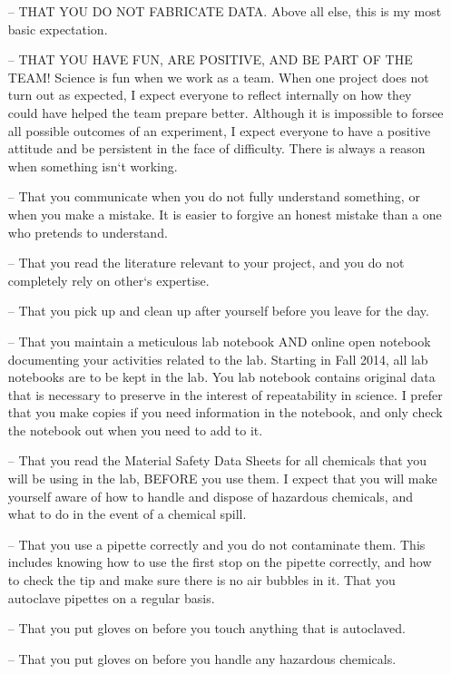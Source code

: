 \documentclass[11pt, oneside]{article}
\begin{document}
		\begin{itemize}


			\item[--] THAT YOU DO NOT FABRICATE DATA.  Above all else, this is my most basic expectation.
			\item[--] THAT YOU HAVE FUN, ARE POSITIVE, AND BE PART OF THE TEAM!  Science is fun when we work as a team.  When one project 			does not turn out as expected, I expect everyone to reflect internally on how they could have helped the team prepare better.  Although it is 			impossible to forsee all possible outcomes of an experiment, I expect everyone to have a positive attitude and be persistent in the face of 			difficulty. There is always a reason when something isn`t working.
			\item[--] That you communicate when you do not fully understand something, or when you make a mistake.  It is easier to forgive an honest 			mistake than a one who pretends to understand.
			\item[--] That you read the literature relevant to your project, and you do not completely rely on other`s expertise.
			\item[--] That you pick up and clean up after yourself before you leave for the day.
			\item[--] That you maintain a meticulous lab notebook AND online open notebook documenting your activities related to the lab.  Starting in Fall 			2014, all lab notebooks are to be kept in the lab.  You lab notebook contains original data that is necessary to preserve in the interest of 				repeatability in science.  I prefer that you make copies if you need information in the notebook, and only check the notebook out when you 			need to add to it.
			\item[--] That you read the Material Safety Data Sheets for all chemicals that you will be using in the lab, BEFORE you use them.  I expect that 			you will make yourself aware of how to handle and dispose of hazardous chemicals, and what to do in the event of a chemical spill.
			\item[--] That you use a pipette correctly and you do not contaminate them.  This includes knowing how to use the first stop on the pipette 			correctly, and how to check the tip and make sure there is no air bubbles in it.  That you autoclave pipettes on a regular basis.
			\item[--] That you put gloves on before you touch anything that is autoclaved.
			\item[--] That you put gloves on before you handle any hazardous chemicals.

\end{itemize}
\end{document}
